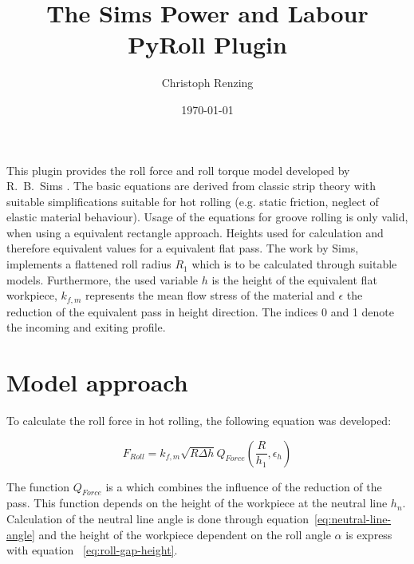 \documentclass[11pt]{PyRollDocs}
\begin{document}
    \title{The Sims Power and Labour PyRoll Plugin}
    \author{Christoph Renzing}
    \date{\today}

    \maketitle

    This plugin provides the roll force and roll torque model developed by R.~B.~Sims \textcite{Sims1954}.
    The basic equations are derived from classic strip theory with suitable simplifications suitable for hot rolling (e.g. static friction, neglect of elastic material behaviour).
    Usage of the equations for groove rolling is only valid, when using a equivalent rectangle approach.
    Heights used for calculation and therefore equivalent values for a equivalent flat pass.
    The work by Sims, implements a flattened roll radius $R_1$ which is to be calculated through suitable models.
    Furthermore, the used variable $h$ is the height of the equivalent flat workpiece, $k_{f,m}$ represents the mean flow stress of the material and $\epsilon$ the reduction of the equivalent pass in height direction.
    The indices 0 and 1 denote the incoming and exiting profile.


    \section{Model approach}\label{sec:model-approach}

    To calculate the roll force in hot rolling, the following equation was developed:

    \begin{equation}
        F_{Roll} = k_{f, m} \sqrt{R \Delta h} Q_{Force}(\frac{R}{h_1}, \epsilon_h)
        \label{eq:sims-force-simple}
    \end{equation}

    The function $Q_{Force}$ is a which combines the influence of the reduction of the pass.
    This function depends on the height of the workpiece at the neutral line $h_{n}$.
    Calculation of the neutral line angle is done through equation~\ref{eq:neutral-line-angle} and the height of the workpiece dependent on the roll angle $\alpha$ is express with equation ~\ref{eq:roll-gap-height}.
\end{document}

